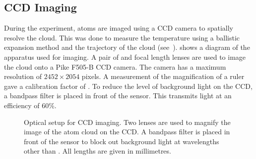 \subsection{CCD Imaging}\label{sec:imaging}
During the experiment, atoms are imaged using a CCD camera to spatially resolve the cloud. This was done to measure the temperature using a ballistic expansion method and the trajectory of the cloud (see~).  shows a
diagram of the apparatus used for imaging. A pair of 
and  focal length lenses are used to image the cloud
onto a Pike F505-B CCD camera. The camera has a maximum resolution of \(2452 \times
2054\) pixels. A measurement of the magnification of a ruler gave a calibration factor of
. To reduce the level of background light on the CCD, a bandpass filter is placed in front of the sensor. This transmits  light at an
efficiency of 60\%.
\begin{figure}[!htbp]
	\centering
	\def\svgwidth{0.6\textwidth}
	
	\caption[Optical setup for CCD imaging]{Optical setup for CCD imaging. Two
		lenses are used to magnify the image of the atom cloud on the CCD. A
		bandpass filter is placed in front of the sensor to block out background
		light at wavelengths other than
		. All lengths are given in millimetres.}
	\label{fig:imaging_optics}
\end{figure}
